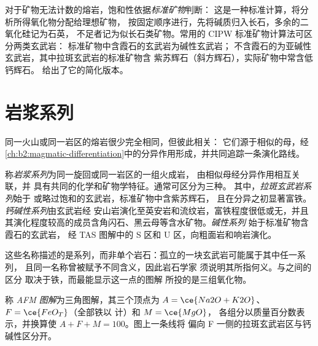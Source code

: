 对于矿物无法计数的熔岩，饱和性依据\emph{标准矿物}判断：
这是一种标准计算，将分析所得氧化物分配给理想矿物，
按固定顺序进行，先将碱质归入长石，多余的二氧化硅记为石英，
不足者记为似长石类矿物。常用的 CIPW 标准矿物计算法可区分两类玄武岩：
标准矿物中含霞石的玄武岩为碱性玄武岩；
不含霞石的为亚碱性玄武岩，其中拉斑玄武岩的标准矿物含
紫苏辉石（斜方辉石），实际矿物中常含低钙辉石。
 给出了它的简化版本。

\section{岩浆系列}\label{sec:b2:magmatic-series:series}

同一火山或同一岩区的熔岩很少完全相同，但彼此相关：
它们源于相似的母，经
\cref{ch:b2:magmatic-differentiation}中的分异作用形成，并共同追踪一条演化路线。

\begin{definition}[岩浆系列]\label{def:b2:magmatic-series:series}
称\emph{岩浆系列}为同一旋回或同一岩区的一组火成岩，
由相似母经分异作用相互关联，并
具有共同的化学和矿物学特征。通常可区分为三种。
其中，\emph{拉斑玄武岩系列}始于
或略过饱和的玄武岩，标准矿物中含紫苏辉石，
且在分异之初显著富铁。
\emph{钙碱性系列}由玄武岩经
安山岩演化至英安岩和流纹岩，富铁程度很低或无，并且
其演化程度较高的成员含角闪石、黑云母等含水矿物。\emph{碱性系列}
始于标准矿物含霞石的玄武岩，
经 TAS 图解中的 S 区和 U 区，向粗面岩和响岩演化。
\end{definition}

这些名称描述的是系列，而非单个岩石：孤立的一块玄武岩可能属于其中任一系列，
且同一名称曾被赋予不同含义，因此岩石学家
须说明其所指何义。与之间的区分
取决于铁，而最能显示这一点的图解
所投的是三组氧化物。

\begin{definition}[AFM 图解]\label{def:b2:magmatic-series:afm}
称 \emph{AFM 图解}为三角图解，其三个顶点为
$A = \ce{Na2O + K2O}$、$F = \ce{FeO_T}$（全部铁以  计）和 $M = \ce{MgO}$，
各组分以质量百分数表示，并换算使 $A + F + M = 100$。图上一条线将
偏向 F 一侧的拉斑玄武岩区与钙碱性区分开。
\end{definition}

